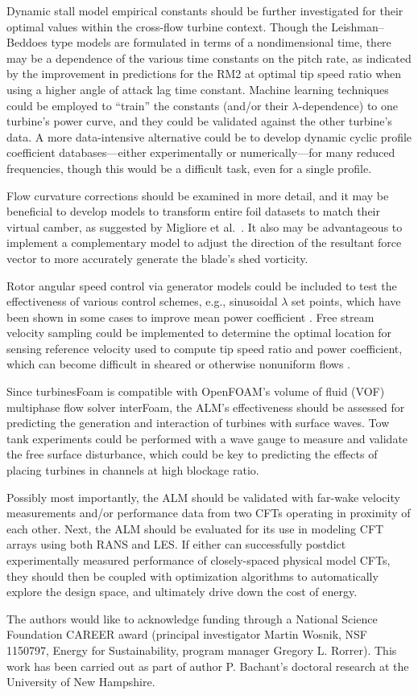 \documentclass[times]{weauth}
\begin{document}
Dynamic stall model empirical constants should be further investigated for their
optimal values within the cross-flow turbine context. Though the
Leishman--Beddoes type models are formulated in terms of a nondimensional time,
there may be a dependence of the various time constants on the pitch rate, as
indicated by the improvement in predictions for the RM2 at optimal tip speed
ratio when using a higher angle of attack lag time constant. Machine learning
techniques could be employed to ``train'' the constants (and/or their
$\lambda$-dependence) to one turbine's power curve, and they could be validated
against the other turbine's data. A more data-intensive alternative could be to
develop dynamic cyclic profile coefficient databases---either experimentally or
numerically---for many reduced frequencies, though this would be a difficult
task, even for a single profile.

Flow curvature corrections should be examined in more detail, and it may be
beneficial to develop models to transform entire foil datasets to match their
virtual camber, as suggested by Migliore et al.~\cite{Migliore1980}. It
also may be advantageous to implement a complementary model to adjust the
direction of the resultant force vector to more accurately generate the blade's
shed vorticity.

Rotor angular speed control via generator models could be included to test the
effectiveness of various control schemes, e.g., sinusoidal $\lambda$ set points,
which have been shown in some cases to improve mean power coefficient
\cite{Strom2015}. Free stream velocity sampling could be implemented to
determine the optimal location for sensing reference velocity used to compute
tip speed ratio and power coefficient, which can become difficult in sheared or
otherwise nonuniform flows \cite{Forbush2015}.

Since turbinesFoam is compatible with OpenFOAM's volume of fluid (VOF)
multiphase flow solver interFoam, the ALM's effectiveness should be assessed for
predicting the generation and interaction of turbines with surface waves. Tow
tank experiments could be performed with a wave gauge to measure and validate
the free surface disturbance, which could be key to predicting the effects of
placing turbines in channels at high blockage ratio.

Possibly most importantly, the ALM should be validated with far-wake velocity
measurements and/or performance data from two CFTs operating in proximity of
each other. Next, the ALM should be evaluated for its use in modeling CFT arrays
using both RANS and LES. If either can successfully postdict experimentally
measured performance of closely-spaced physical model CFTs, they should then be
coupled with optimization algorithms to automatically explore the design space,
and ultimately drive down the cost of energy.


\acks The authors would like to acknowledge funding through a National Science
Foundation CAREER award (principal investigator Martin Wosnik, NSF 1150797,
Energy for Sustainability, program manager Gregory L. Rorrer). This work has
been carried out as part of author P. Bachant's doctoral research at the
University of New Hampshire.



\end{document}
